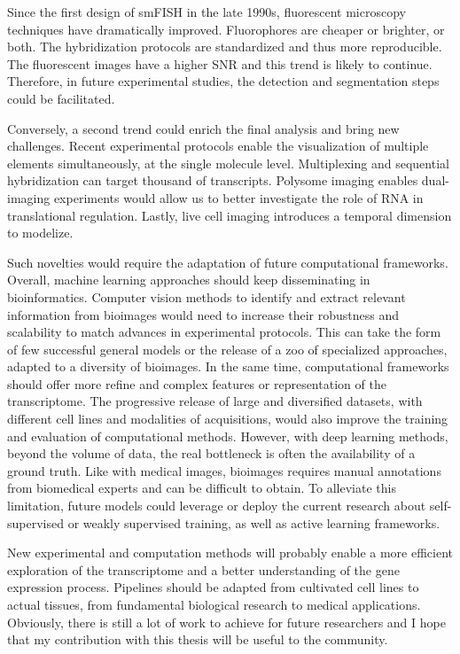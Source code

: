 Since the first design of \ac{smFISH} in the late 1990s, fluorescent microscopy techniques have dramatically improved.
Fluorophores are cheaper or brighter, or both.
The hybridization protocols are standardized and thus more reproducible.
The fluorescent images have a higher \ac{SNR} and this trend is likely to continue.
Therefore, in future experimental studies, the detection and segmentation steps could be facilitated.

Conversely, a second trend could enrich the final analysis and bring new challenges.
Recent experimental protocols enable the visualization of multiple elements simultaneously, at the single molecule level.
Multiplexing and sequential hybridization can target thousand of transcripts.
Polysome imaging enables dual-imaging experiments would allow us to better investigate the role of \ac{RNA} in translational regulation.
Lastly, live cell imaging introduces a temporal dimension to modelize.

Such novelties would require the adaptation of future computational frameworks.
Overall, machine learning approaches should keep disseminating in bioinformatics.
Computer vision methods to identify and extract relevant information from bioimages would need to increase their robustness and scalability to match advances in experimental protocols.
This can take the form of few successful general models or the release of a zoo of specialized approaches, adapted to a diversity of bioimages.
In the same time, computational frameworks should offer more refine and complex features or representation of the transcriptome.
The progressive release of large and diversified datasets, with different cell lines and modalities of acquisitions, would also improve the training and evaluation of computational methods.
However, with deep learning methods, beyond the volume of data, the real bottleneck is often the availability of a ground truth.
Like with medical images, bioimages requires manual annotations from biomedical experts and can be difficult to obtain.
To alleviate this limitation, future models could leverage or deploy the current research about self-supervised or weakly supervised training, as well as active learning frameworks.

New experimental and computation methods will probably enable a more efficient exploration of the transcriptome and a better understanding of the gene expression process.
Pipelines should be adapted from cultivated cell lines to actual tissues, from fundamental biological research to medical applications.
Obviously, there is still a lot of work to achieve for future researchers and I hope that my contribution with this thesis will be useful to the community.

